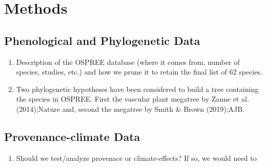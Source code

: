 \documentclass{article}\usepackage[]{graphicx}\usepackage[]{color}
\begin{document}
\section*{Methods}
\subsection*{Phenological and Phylogenetic Data}
\begin{enumerate}
\item Description of the OSPREE database (where it comes from, number of species, studies, etc.) and how we prune it to retain the final list of 62 species. 
\item Two phylogenetic hypotheses have been considered to build a tree containing the species in OSPREE. First the vascular plant megatree by Zanne et al. (2014);Nature and, second the megatree by Smith \& Brown (2019);AJB.
\end{enumerate}

\subsection*{Provenance-climate Data}
\begin{enumerate}
\item Should we test/analyze provenace or climate-effects? If so, we would need to 
\end{enumerate}
\end{document}
